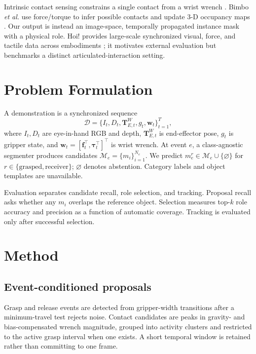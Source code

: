 \documentclass[letterpaper,10pt,journal,twoside]{IEEEtran}
\begin{document}
Intrinsic contact sensing constrains a single contact from a wrist wrench
\cite{bicchi1990}. Bimbo \emph{et al.} use force/torque to infer possible
contacts and update 3-D occupancy maps \cite{bimbo2022mapping}. Our output is
instead an image-space, temporally propagated instance mask with a physical
role. Hoi! provides large-scale synchronized visual, force, and tactile data
across embodiments \cite{engelbracht2026hoi}; it motivates external evaluation
but benchmarks a distinct articulated-interaction setting.

\section{Problem Formulation}

A demonstration is a synchronized sequence
\begin{equation}
\mathcal{D}=\{I_t,D_t,\mathbf{T}^{W}_{E,t},g_t,
\mathbf{w}_t\}_{t=1}^{T},
\end{equation}
where $I_t,D_t$ are eye-in-hand RGB and depth,
$\mathbf{T}^{W}_{E,t}$ is end-effector pose, $g_t$ is gripper state, and
$\mathbf{w}_t=[\mathbf{f}_t^\top,\boldsymbol{\tau}_t^\top]^\top$ is wrist
wrench. At event $e$, a class-agnostic segmenter produces candidates
$\mathcal{M}_e=\{m_i\}_{i=1}^{N_e}$. We predict
$m_e^{r}\in\mathcal{M}_e\cup\{\varnothing\}$ for
$r\in\{\mathrm{grasped},\mathrm{receiver}\}$; $\varnothing$ denotes
abstention. Category labels and object templates are unavailable.

Evaluation separates candidate recall, role selection, and tracking. Proposal
recall asks whether any $m_i$ overlaps the reference object. Selection measures
top-$k$ role accuracy and precision as a function of automatic coverage.
Tracking is evaluated only after successful selection.

\section{Method}

\subsection{Event-conditioned proposals}

Grasp and release events are detected from gripper-width transitions after a
minimum-travel test rejects noise. Contact candidates are peaks in gravity- and
bias-compensated wrench magnitude, grouped into activity clusters and restricted
to the active grasp interval when one exists. A short temporal window is
retained rather than committing to one frame.
\end{document}
